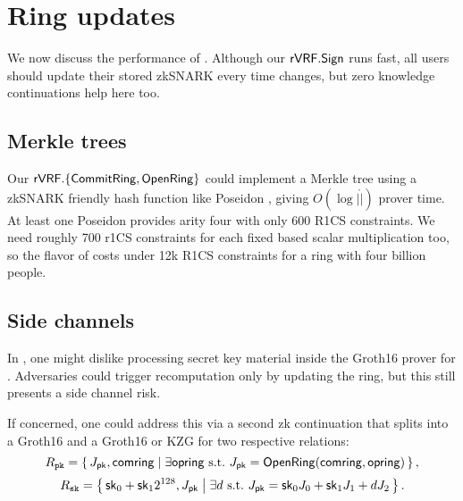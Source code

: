 \section{Ring updates}
\label{sec:ring_updates}


We now discuss the performance of \pifast.
Although our ${\mathsf{rVRF}}.{\mathsf{Sign}}$ runs fast, all users should update their
stored zkSNARK \pifast every time \ring changes, %
but zero knowledge continuations help here too.


\subsection{Merkle trees} %

Our ${\mathsf{rVRF}}.\{ {\mathsf{CommitRing}}, {\mathsf{OpenRing}} \}$ could implement a Merkle tree
using a zkSNARK friendly hash function like Poseidon \cite{poseidon},
giving $O(\log |\ring|)$ prover time.
%
At least one Poseidon \cite{poseidon} provides arity four with only
600 R1CS constraints.  We need roughly 700 r1CS constraints for each
fixed based scalar multiplication too, so the flavor of \pifast costs
under 12k R1CS constraints for a ring with four billion people.



\subsection{Side channels}
\label{subsec:rvrf_side_channel}

In \pifast, one might dislike processing secret key material inside
the Groth16 prover for \pifast.
Adversaries could trigger \pifast recomputation only by updating the ring,
but this still presents a side channel risk.

If concerned, one could address this via a second zk continuation that
splits \pifast into a Groth16 \pisk and a Groth16 or KZG \pipk for two
respective relations:
%
$$ \Lpk = \Setst{ J_\pk, \comring }{
	\exists \openring \textrm{\ s.t.\ }
	J_\pk = \eprint{\rVRF.}{}\OpenRing(\comring,\openring)
} \mathcomma \eprint{\quad\textrm{and}}{} $$ 
%
$$ \Lsk = \Setst{ \sk_0 + \sk_1 2^{128}, J_\pk }{ 
	\exists d \textrm{\ s.t.\ }
	J_\pk = \sk_0 \genJ_0 + \sk_1 \genJ_1 + d \genJ_2
} \mathperiod $$

